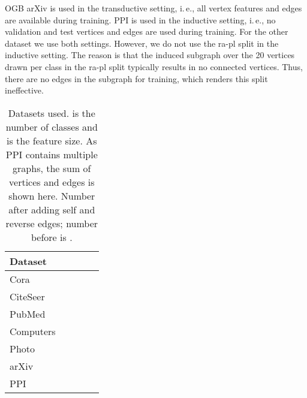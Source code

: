 \documentclass[runningheads]{llncs}
\newcommand{\ie}{i.\,e.,\xspace}
\begin{document}
OGB arXiv is used in the transductive setting, \ie all vertex features and edges are available during training.
PPI is used in the inductive setting, \ie no validation and test vertices and edges are used during training.
For the other dataset we use both settings.
However, we do not use the ra-pl split in the inductive setting.
The reason is that the induced subgraph over the 20 vertices drawn per class in the ra-pl split typically results in no connected vertices.
Thus, there are no edges in the subgraph for training, which renders this split ineffective.

\begin{table}[!ht]
    \centering
    \caption{Datasets used.  is the number of classes and  is the feature size.
    As PPI contains multiple graphs, the sum of vertices and edges is shown here. Number after adding self and reverse edges; number before is .}
    \label{tab:datasets}
\small
    \begin{tabular}{l|r|r|r|r}\toprule
         Dataset  &  &  &  &  \\ \midrule
         Cora     &   &  &    &    \\
         CiteSeer &   &  &    &     \\
         PubMed   &   &    &   &    \\\midrule
         Computers &   &    &   &    \\
         Photo    &   &    &   &    \\\midrule
         arXiv    &  &    &  & \\ 
         PPI      &  &    &  & \\ \bottomrule
    \end{tabular}
\end{table}
\end{document}
